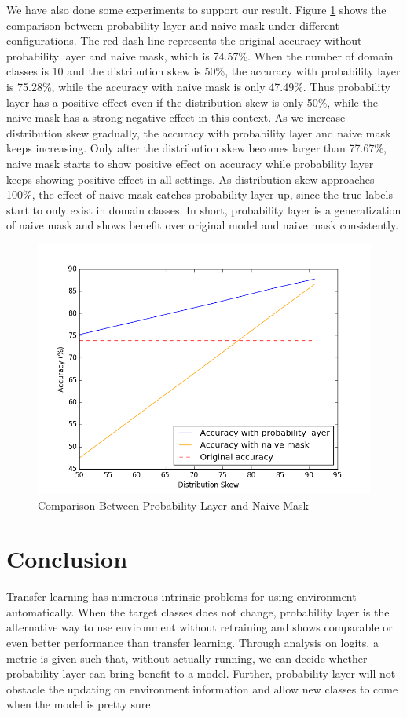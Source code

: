 \documentclass{article}
\begin{document}
We have also done some experiments to support our result. Figure \ref{fig:NaiveMask} shows the comparison between probability layer and naive mask under different configurations. The red dash line represents the original accuracy without probability layer and naive mask, which is 74.57\%. When the number of domain classes is 10 and the distribution skew is 50\%, the accuracy with probability layer is 75.28\%, while the accuracy with naive mask is only 47.49\%. Thus probability layer has a positive effect even if the distribution skew is only 50\%, while the naive mask has a strong negative effect in this context. As we increase distribution skew gradually, the accuracy with probability layer and naive mask keeps increasing. Only after the distribution skew becomes larger than 77.67\%, naive mask starts to show positive effect on accuracy while probability layer keeps showing positive effect in all settings. As distribution skew approaches 100\%, the effect of naive mask catches probability layer up, since the true labels start to only exist in domain classes. In short, probability layer is a generalization of naive mask and shows benefit over original model and naive mask consistently.

\begin{figure}
\includegraphics[scale=0.43]{figure_1-1.png}
\caption{Comparison Between Probability Layer and Naive Mask}
\label{fig:NaiveMask}
\end{figure}

\section{Conclusion}
Transfer learning has numerous intrinsic problems for using environment automatically. When the target classes does not change, probability layer is the alternative way to use environment without retraining and shows comparable or even better performance than transfer learning. Through analysis on logits, a metric is given such that, without actually running, we can decide whether probability layer can bring benefit to a model. Further, probability layer will not obstacle the updating on environment information and allow new classes to come when the model is pretty sure.





\end{document}
